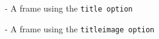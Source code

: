 \begin{frame}[t,title]{-}
	A frame using the \texttt{title option}
\end{frame}

\begin{frame}[t,titleimage]{-}
	A frame using the \texttt{titleimage option}
\end{frame}

